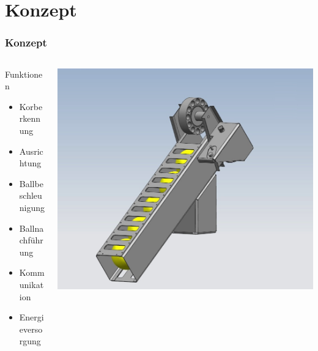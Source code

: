 \section{Konzept} %
\begin{frame}
    \frametitle{Konzept}
    \begin{columns}
        \begin{column}{0.4\textwidth}
            \begin{block}{Funktionen}
                \begin{itemize}
                    \item<2-> Korberkennung
                    \item<3-> Ausrichtung
                    \item<4-> Ballbeschleunigung
                    \item<5-> Ballnachführung
                    \item<6-> Kommunikation
                    \item<7-> Energieversorgung
                \end{itemize}
            \end{block}
        \end{column}
        \begin{column}{0.6\textwidth}
            \includegraphics[width=\textwidth]{../doc/fig/Balllager.jpg}
        \end{column}
    \end{columns}
\end{frame}

